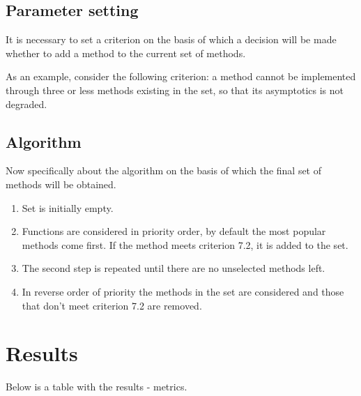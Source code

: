 \documentclass[anonymous,sigplan,review,11pt,nonacm,natbib=false]{acmart}
\begin{document}
    \subsection{Parameter setting}

    It is necessary to set a criterion on the basis of which a decision will be made whether to add a method to the current set of methods.

    As an example, consider the following criterion: a method cannot be implemented through three or less methods existing in the set, so that its asymptotics is not degraded.

    \subsection{Algorithm}

    Now specifically about the algorithm on the basis of which the final set of methods will be obtained.

    \begin{enumerate}
        \item Set is initially empty.
        \item Functions are considered in priority order, by default the most popular methods come first. If the method meets criterion 7.2, it is added to the set.
        \item The second step is repeated until there are no unselected methods left.
        \item In reverse order of priority the methods in the set are considered and those that don't meet criterion 7.2 are removed.
    \end{enumerate}

    \section{Results}

    Below is a table with the results - metrics.
\end{document}
